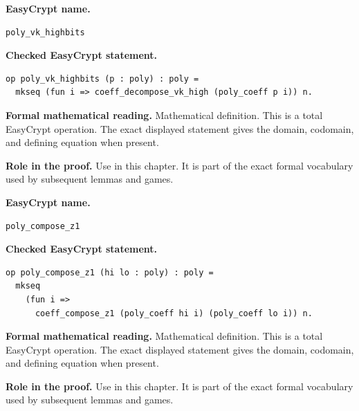 \begin{formaldefinition}
\noindent\textbf{EasyCrypt name.}
\begin{lstlisting}[language=EasyCrypt,basicstyle=\ttfamily\scriptsize]
poly_vk_highbits
\end{lstlisting}
\noindent\textbf{Checked EasyCrypt statement.}
\begin{lstlisting}[language=EasyCrypt,basicstyle=\ttfamily\scriptsize]
op poly_vk_highbits (p : poly) : poly =
  mkseq (fun i => coeff_decompose_vk_high (poly_coeff p i)) n.
\end{lstlisting}
\noindent\textbf{Formal mathematical reading.}
Mathematical definition. This is a total EasyCrypt operation.  The exact displayed statement gives the domain, codomain, and defining equation when present.

\noindent\textbf{Role in the proof.}
Use in this chapter. It is part of the exact formal vocabulary used by subsequent lemmas and games.

\end{formaldefinition}

\begin{formaldefinition}
\noindent\textbf{EasyCrypt name.}
\begin{lstlisting}[language=EasyCrypt,basicstyle=\ttfamily\scriptsize]
poly_compose_z1
\end{lstlisting}
\noindent\textbf{Checked EasyCrypt statement.}
\begin{lstlisting}[language=EasyCrypt,basicstyle=\ttfamily\scriptsize]
op poly_compose_z1 (hi lo : poly) : poly =
  mkseq
    (fun i =>
      coeff_compose_z1 (poly_coeff hi i) (poly_coeff lo i)) n.
\end{lstlisting}
\noindent\textbf{Formal mathematical reading.}
Mathematical definition. This is a total EasyCrypt operation.  The exact displayed statement gives the domain, codomain, and defining equation when present.

\noindent\textbf{Role in the proof.}
Use in this chapter. It is part of the exact formal vocabulary used by subsequent lemmas and games.

\end{formaldefinition}

